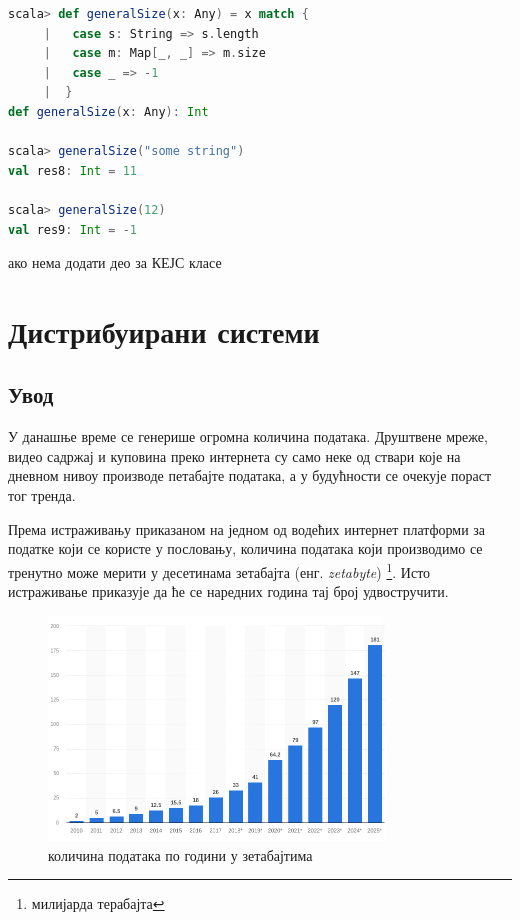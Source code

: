 \documentclass[12pt,oneside]{memoir}
\begin{document}
\begin{lstlisting}[language=Scala, caption={}, label={lst:}]
scala> def generalSize(x: Any) = x match {
     |   case s: String => s.length
     |   case m: Map[_, _] => m.size
     |   case _ => -1
     |  }
def generalSize(x: Any): Int

scala> generalSize("some string")
val res8: Int = 11

scala> generalSize(12)
val res9: Int = -1
\end{lstlisting}

ако нема додати део за КЕЈС класе



\chapter{Дистрибуирани системи}
\label{chp:dist_sis}

\section{Увод}
\label{sec:uvod}

У данашње време се генерише огромна количина података. Друштвене мреже, видео садржај и куповина преко интернета су само неке од ствари које на дневном нивоу производе петабајте података, а у будућности се очекује пораст тог тренда.

Према истраживању приказаном на једном од водећих интернет платформи за податке који се користе у пословању, количина података који производимо се тренутно може мерити у десетинама зетабајта (енг. \textit{zetabyte}) \footnote{милијарда терабајта}. Исто истраживање приказује да ће се наредних година тај број удвостручити. \cite{volume_data}

\begin{figure}[!ht]
  \centering
  \includegraphics[width=0.8\textwidth]{pictures/Total_data_volume_worldwide_2010_2025_statista.png}
  \caption{количина података по години у зетабајтима}
  \label{fig:kolicina_podataka}
\end{figure}
\end{document}
